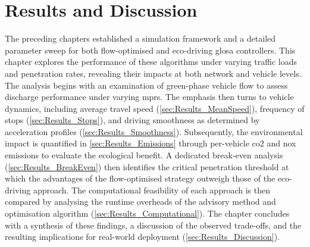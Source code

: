 \chapter{Results and Discussion}
\label{ch:ResultsDiscussion}

The preceding chapters established a simulation framework and a detailed parameter sweep for both flow-optimised and eco-driving \ac{glosa} controllers. This chapter explores the performance of these algorithms under varying traffic loads and penetration rates, revealing their impacts at both network and vehicle levels.
\mynewline
The analysis begins with an examination of green-phase vehicle flow to assess discharge performance under varying \acp{mpr}. The emphasis then turns to vehicle dynamics, including average travel speed (\ref{sec:Results_MeanSpeed}), frequency of stops (\ref{sec:Results_Stops}), and driving smoothness as determined by acceleration profiles (\ref{sec:Results_Smoothness}). Subsequently, the environmental impact is quantified in \ref{sec:Results_Emissions} through per-vehicle \ac{co2} and \ac{nox} emissions to evaluate the ecological benefit. A dedicated break-even analysis (\ref{sec:Results_BreakEven}) then identifies the critical penetration threshold at which the advantages of the flow-optimised strategy outweigh those of the eco-driving approach. The computational feasibility of each approach is then compared by analysing the runtime overheads of the advisory method and optimisation algorithm (\ref{sec:Results_Computational}). The chapter concludes with a synthesis of these findings, a discussion of the observed trade-offs, and the resulting implications for real-world deployment (\ref{sec:Results_Discussion}).















